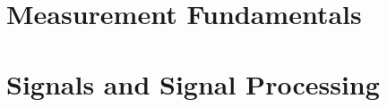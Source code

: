 






\frontmatter
\tableofcontents
\newpage






\mainmatter



\part{Measurement Fundamentals}








\part{Signals and Signal Processing}

